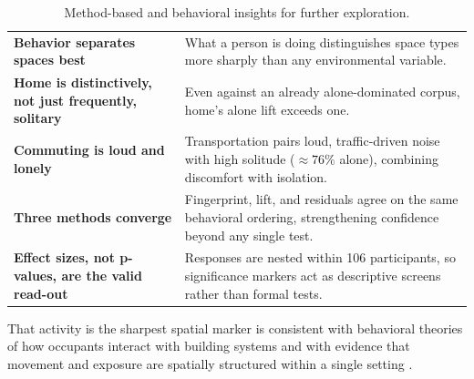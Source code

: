 \documentclass[]{interact}
\begin{document}
\begin{table}[htbp]
\centering
\caption{Method-based and behavioral insights for further exploration.}
\label{tab:insights-behaviour}
\footnotesize
\renewcommand{\arraystretch}{1.3}
\begin{tabularx}{\textwidth}{@{}>{\raggedright\arraybackslash\bfseries}p{} >{\raggedright\arraybackslash}X@{}}
\midrule
Behavior separates spaces best & What a person is doing distinguishes space types more sharply than any environmental variable. \\
Home is distinctively, not just frequently, solitary & Even against an already alone-dominated corpus, home's alone lift exceeds one. \\
Commuting is loud and lonely & Transportation pairs loud, traffic-driven noise with high solitude ($\approx 76\%$ alone), combining discomfort with isolation. \\
Three methods converge & Fingerprint, lift, and residuals agree on the same behavioral ordering, strengthening confidence beyond any single test. \\
Effect sizes, not p-values, are the valid read-out & Responses are nested within 106 participants, so significance markers act as descriptive screens rather than formal tests. \\
\bottomrule
\end{tabularx}
\end{table}

That activity is the sharpest spatial marker is consistent with behavioral theories of how occupants interact with building systems \citep{Heydarian2020-is} and with evidence that movement and exposure are spatially structured within a single setting \citep{Pollard2022-gl}.
\end{document}
